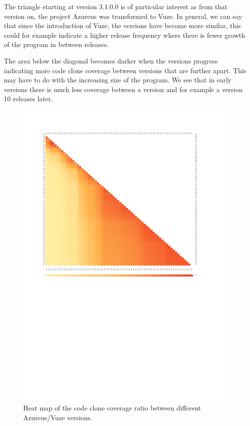 \documentclass[a4paper,twoside, twocolumn, 11pt]{article}
\numberwithin{equation}{section}
\begin{document}
The triangle starting at version 3.1.0.0 is of particular interest as from that version on, the project Azureus was transformed to Vuze.
In general, we can say that since the introduction of Vuze, the versions have become more similar, this could for example indicate a higher release frequency where there is fewer growth of the program in between releases.

The area below the diagonal becomes darker when the versions progress indicating more code clone coverage between versions that are further apart.
This may have to do with the increasing size of the program. 
We see that in early versions there is much less coverage between a version and for example a version 10 releases later.

\begin{figure}
\center
\includegraphics[width=\textwidth]{first66min-max.pdf}
\caption{Heat map of the code clone coverage ratio between different Azureus/Vuze versions.}
\label{fig:min-max}
\end{figure}
\end{document}
